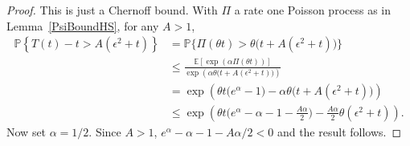 \documentclass[EJP]{ejpecp} %
\newcommand{\IP}{\mathbb P}
\newcommand{\IE}{\mathbb E}
\begin{document}
\begin{proof}
    This is just a Chernoff bound. With $\Pi$ a rate one Poisson process as
	in Lemma~\ref{PsiBoundHS}, for any $A>1$,
	\begin{align*}
        \IP\left\{
            T(t) - t > A(\epsilon^2 + t)
        \right\}
&=
        \IP\Big\{
            \Pi(\theta t)
            >
		\theta\Big( t + A(\epsilon^2 + t)\Big)
        \Big\} \\
&\leq\frac{\IE\left[\exp\left(\alpha\Pi(\theta t)\right)\right]}
		{\exp\left(\alpha\theta\big(t+A(\epsilon^2+t)\big)\right)}
		\\
		&=\exp\left(\theta t\big(e^\alpha-1\big)-\alpha\theta\big(t+A(\epsilon^2+t)\big)\right)
		\\
		&\leq
		\exp\left(\theta t\big(e^\alpha-\alpha-1-\frac{A\alpha}{2}\big)
		-\frac{A\alpha}{2}\theta(\epsilon^2+t)\right).
    \end{align*}
	Now set $\alpha=1/2$. Since $A>1$, $e^\alpha-\alpha-1-A\alpha/2<0$ and the 
	result follows.
\end{proof}
\end{document}
